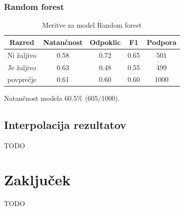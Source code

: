 \documentclass{acm_proc_article-sp}
\begin{document}
\subsubsection{Random forest}
\begin{table}[h!]
	\centering
	\caption{Meritve za model Random forest}
	\begin{tabular}{|c|c|c|c|c|}
		\hline
		\textbf{Razred} & \textbf{Natančnost} & \textbf{Odpoklic} & \textbf{F1} & \textbf{Podpora} \\ \hline
		Ni žaljivo & 0.58 & 0.72 & 0.65 & 501 \\ \hline
		Je žaljivo & 0.63 & 0.48 & 0.55 & 499 \\ \hline \hline
		povprečje & 0.61 & 0.60 & 0.60 & 1000 \\ \hline
	\end{tabular}
\end{table}
Natančnost modela 60.5\% (605/1000).

\subsection{Interpolacija rezultatov}
TODO

\section{Zaključek}
TODO


 
\end{document}
